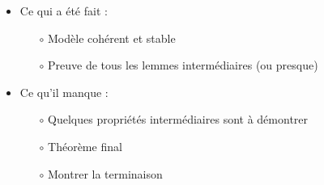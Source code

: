 \documentclass{beamer}
\theoremstyle{definition}
\begin{document}
\begin{frame}
    \begin{itemize}
        \item Ce qui a été fait :
        \begin{itemize}
          \item[$\circ$] Modèle cohérent et stable
          \item[$\circ$] Preuve de tous les lemmes intermédiaires (ou presque)
        \end{itemize}
        \vfill
        \item Ce qu'il manque :
        \begin{itemize}
          \item[$\circ$] Quelques propriétés intermédiaires sont à démontrer
          \item[$\circ$] Théorème final
          \item[$\circ$] Montrer la terminaison
        \end{itemize}
    \end{itemize}
\end{frame}
\end{document}
